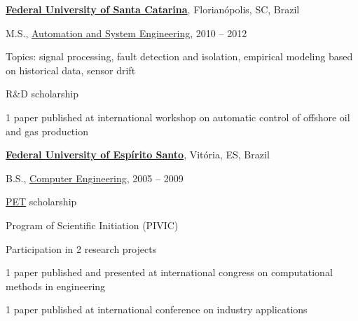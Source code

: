 \documentclass[10pt]{article}
\renewcommand{\section}[1]{\pagebreak[3]%
    \hyphenpenalty=10000%
    \vspace{1.3\baselineskip}%
    \phantomsection\addcontentsline{toc}{section}{#1}%
    \noindent\llap{\scshape\smash{\parbox[t]{\marginparwidth}{\raggedright #1}}}%
    \vspace{-\baselineskip}\par}
\newcommand{\blankline}{\quad\pagebreak[3]}
\begin{document}
\href{http://www.ufsc.br}{\textbf{Federal University of Santa Catarina}},
Florianópolis, SC, Brazil
\begin{outerlist}

\item[] M.S.,
        \href{http://www.pgeas.ufsc.br/}
             {Automation and System Engineering}, 2010 -- 2012
        \begin{innerlist}
        \item Topics: signal processing, fault detection and isolation, empirical modeling
            based on historical data, sensor drift
        \item R\&D scholarship
        \item 1 paper published at international workshop on automatic control of offshore
            oil and gas production
        \end{innerlist}
\end{outerlist}

\blankline

\href{http://www.ufes.br}{\textbf{Federal University of Espírito Santo}},
Vitória, ES, Brazil
\begin{outerlist}

\item[] B.S.,
        \href{http://www.inf.ufes.br/}
             {Computer Engineering}, 2005 -- 2009
        \begin{innerlist}
        \item \href{http://www.inf.ufes.br/~pet}{PET} scholarship 
        \item Program of Scientific Initiation (PIVIC)
        \item Participation in 2 research projects
        \item 1 paper published and presented at international congress on computational
            methods in engineering
        \item 1 paper published at international conference on industry applications
        \end{innerlist}

\end{outerlist}

% 
% 
% 
\end{document}
